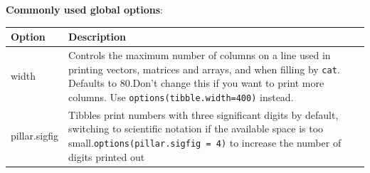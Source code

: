 \documentclass[
]{book}
\newenvironment{Shaded}{\begin{snugshade}}{\end{snugshade}}
\newcommand{\AttributeTok}[1]{\textcolor[rgb]{0.13,0.29,0.53}{#1}}
\newcommand{\CommentTok}[1]{\textcolor[rgb]{0.56,0.35,0.01}{\textit{#1}}}
\newcommand{\DecValTok}[1]{\textcolor[rgb]{0.00,0.00,0.81}{#1}}
\newcommand{\DocumentationTok}[1]{\textcolor[rgb]{0.56,0.35,0.01}{\textbf{\textit{#1}}}}
\newcommand{\FunctionTok}[1]{\textcolor[rgb]{0.13,0.29,0.53}{\textbf{#1}}}
\newcommand{\NormalTok}[1]{#1}
\newcommand{\SpecialCharTok}[1]{\textcolor[rgb]{0.81,0.36,0.00}{\textbf{#1}}}
\newcommand{\StringTok}[1]{\textcolor[rgb]{0.31,0.60,0.02}{#1}}
\theoremstyle{definition}
\theoremstyle{definition}
\theoremstyle{definition}
\theoremstyle{definition}
\theoremstyle{remark}
\begin{document}
\begin{Shaded}
\end{Shaded}

\textbf{Commonly used global options}:

\begin{longtable}[]{@{}
  >{\raggedright\arraybackslash}p{}
  >{\raggedright\arraybackslash}p{}@{}}
\toprule\noalign{}
\begin{minipage}[b]{\linewidth}\raggedright
Option
\end{minipage} & \begin{minipage}[b]{\linewidth}\raggedright
Description
\end{minipage} \\
\midrule\noalign{}
\endhead
\bottomrule\noalign{}
\endlastfoot
width & Controls the maximum number of columns on a line used in printing vectors, matrices and arrays, and when filling by \texttt{cat}. Defaults to 80.Don't change this if you want to print more columns. Use {\texttt{options(tibble.width=400)}} instead. \\
pillar.sigfig & Tibbles print numbers with three significant digits by default, switching to scientific notation if the available space is too small.\texttt{options(pillar.sigfig\ =\ 4)} to increase the number of digits printed out \\
\end{longtable}
\end{document}
